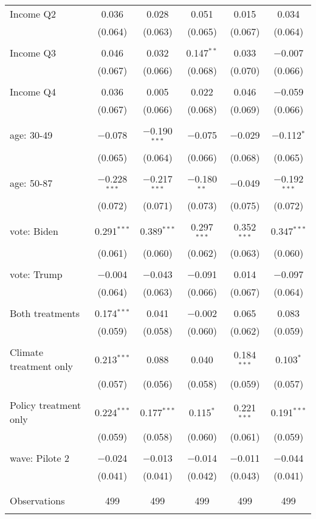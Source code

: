 \begin{tabular}{@{\extracolsep{5pt}}lccccc}
 Income Q2 & 0.036 & 0.028 & 0.051 & 0.015 & 0.034 \\ 
  & (0.064) & (0.063) & (0.065) & (0.067) & (0.064) \\ 
  & & & & & \\ 
 Income Q3 & 0.046 & 0.032 & 0.147$^{**}$ & 0.033 & $-$0.007 \\ 
  & (0.067) & (0.066) & (0.068) & (0.070) & (0.066) \\ 
  & & & & & \\ 
 Income Q4 & 0.036 & 0.005 & 0.022 & 0.046 & $-$0.059 \\ 
  & (0.067) & (0.066) & (0.068) & (0.069) & (0.066) \\ 
  & & & & & \\ 
 age: 30-49 & $-$0.078 & $-$0.190$^{***}$ & $-$0.075 & $-$0.029 & $-$0.112$^{*}$ \\ 
  & (0.065) & (0.064) & (0.066) & (0.068) & (0.065) \\ 
  & & & & & \\ 
 age: 50-87 & $-$0.228$^{***}$ & $-$0.217$^{***}$ & $-$0.180$^{**}$ & $-$0.049 & $-$0.192$^{***}$ \\ 
  & (0.072) & (0.071) & (0.073) & (0.075) & (0.072) \\ 
  & & & & & \\ 
 vote: Biden & 0.291$^{***}$ & 0.389$^{***}$ & 0.297$^{***}$ & 0.352$^{***}$ & 0.347$^{***}$ \\ 
  & (0.061) & (0.060) & (0.062) & (0.063) & (0.060) \\ 
  & & & & & \\ 
 vote: Trump & $-$0.004 & $-$0.043 & $-$0.091 & 0.014 & $-$0.097 \\ 
  & (0.064) & (0.063) & (0.066) & (0.067) & (0.064) \\ 
  & & & & & \\ 
 Both treatments & 0.174$^{***}$ & 0.041 & $-$0.002 & 0.065 & 0.083 \\ 
  & (0.059) & (0.058) & (0.060) & (0.062) & (0.059) \\ 
  & & & & & \\ 
 Climate treatment only & 0.213$^{***}$ & 0.088 & 0.040 & 0.184$^{***}$ & 0.103$^{*}$ \\ 
  & (0.057) & (0.056) & (0.058) & (0.059) & (0.057) \\ 
  & & & & & \\ 
 Policy treatment only & 0.224$^{***}$ & 0.177$^{***}$ & 0.115$^{*}$ & 0.221$^{***}$ & 0.191$^{***}$ \\ 
  & (0.059) & (0.058) & (0.060) & (0.061) & (0.059) \\ 
  & & & & & \\ 
 wave: Pilote 2 & $-$0.024 & $-$0.013 & $-$0.014 & $-$0.011 & $-$0.044 \\ 
  & (0.041) & (0.041) & (0.042) & (0.043) & (0.041) \\ 
  & & & & & \\ 
\hline \\[-1.8ex] 

Observations & 499 & 499 & 499 & 499 & 499 \\ 
\hline 
\hline \\[-1.8ex] 
\end{tabular} 